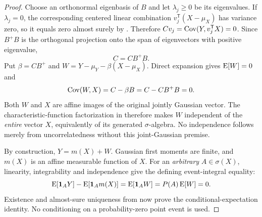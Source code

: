 \begin{proof}
Choose an orthonormal eigenbasis of \(B\) and let \(\lambda_j\geq0\)
be its eigenvalues. If \(\lambda_j=0\), the corresponding centered
linear combination \(v_j^{\mathsf T}(X-\mu_X)\) has variance zero, so
it equals zero almost surely by . Therefore
\(Cv_j=\operatorname{Cov}(Y,v_j^{\mathsf T}X)=0\). Since \(B^+B\) is the orthogonal
projection onto the span of eigenvectors with positive eigenvalue,
\[
 C=CB^+B.
\]
Put \(\beta=CB^+\) and
\(W=Y-\mu_Y-\beta(X-\mu_X)\). Direct expansion gives
\(\operatorname{E}[W]=0\) and
\[
 \operatorname{Cov}(W,X)=C-\beta B=C-CB^+B=0.
\]
Both \(W\) and \(X\) are affine images of the original jointly Gaussian
vector. The characteristic-function factorization in
 therefore makes \(W\) independent of the
\emph{entire} vector \(X\), equivalently of its generated
\(\sigma\)-algebra. No independence follows merely from uncorrelatedness
without this joint-Gaussian premise.

By construction, \(Y=m(X)+W\). Gaussian first moments are finite, and
\(m(X)\) is an affine measurable function of \(X\). For an
\emph{arbitrary} \(A\in\sigma(X)\), linearity, integrability and
independence give the defining event-integral equality:
\[
 \operatorname{E}[\mathbf{1}_A Y]-\operatorname{E}[\mathbf{1}_A m(X)]
 =\operatorname{E}[\mathbf{1}_A W]
 =P(A)\operatorname{E}[W]=0.
\]
Existence and almost-sure uniqueness from 
now prove the conditional-expectation identity. No conditioning on
a probability-zero point event is used.
\end{proof}

